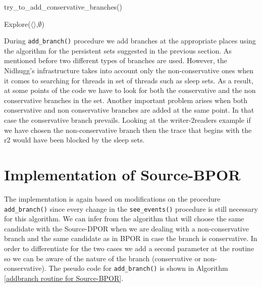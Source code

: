 \begin{algorithm}[H]
    \caption{try\_to\_add\_conservative\_branches()}
    \label{seeevents routine for BPOR}
    Explore($\langle \rangle$,$\emptyset$)\;
\end{algorithm}

During \verb|add_branch()| procedure we add branches at the appropriate places using the algorithm for the persistent
sets suggested in the previous section. As mentioned before two different types of branches are used. However, the
Nidhugg's infrastructure takes into account only the non-conservative ones when it comes to searching for threads in set
of threads such as sleep sets. As a result, at some points of the code we have to look for both the conservative and the
non conservative branches in the set. Another important problem arises when both conservative and non conservative
branches are added at the same point. In that case the conservative branch prevails. Looking at the writer-2readers
example if we have chosen the non-conservative branch then the trace that begins with the r2 would have been blocked by
the sleep sets.

\section{Implementation of Source-BPOR}

The implementation is again based on modifications on the procedure \verb|add_branch()| since every change in the
\verb|see_events()| procedure is still necessary for this algorithm. We can infer from the algorithm that will choose
the same candidate with the Source-DPOR when we are dealing with a non-conservative branch and the same candidate as in
BPOR in case the branch is conservative. In order to differentiate for the two cases we add a second parameter at the
routine so we can be aware of the nature of the branch (conservative or non-conservative). The pseudo code for
\verb|add_branch()| is shown in Algorithm \ref{addbranch routine for Source-BPOR}.

